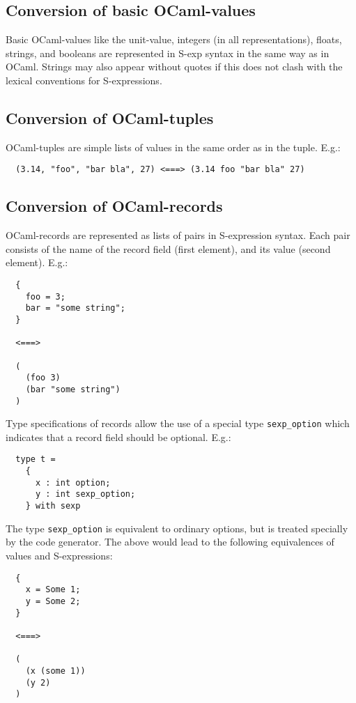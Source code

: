 \documentclass[a4paper]{article}
\begin{document}
\subsection{Conversion of basic OCaml-values}

Basic OCaml-values like the unit-value, integers (in all representations),
floats, strings, and booleans are represented in S-exp syntax in the
same way as in OCaml.  Strings may also appear without quotes if this
does not clash with the lexical conventions for S-expressions.

\subsection{Conversion of OCaml-tuples}

OCaml-tuples are simple lists of values in the same order as in the tuple.
E.g.:

\begin{verbatim}
  (3.14, "foo", "bar bla", 27) <===> (3.14 foo "bar bla" 27)
\end{verbatim}

\subsection{Conversion of OCaml-records}

OCaml-records are represented as lists of pairs in S-expression syntax.
Each pair consists of the name of the record field (first element),
and its value (second element).  E.g.:

\begin{verbatim}
  {
    foo = 3;
    bar = "some string";
  }

  <===>

  (
    (foo 3)
    (bar "some string")
  )
\end{verbatim}

Type specifications of records allow the use of a special type
\verb=sexp_option= which indicates that a record field should be optional.
E.g.:

\begin{verbatim}
  type t =
    {
      x : int option;
      y : int sexp_option;
    } with sexp
\end{verbatim}

The type \verb=sexp_option= is equivalent to ordinary options, but is
treated specially by the code generator.  The above would lead to the
following equivalences of values and S-expressions:

\begin{verbatim}
  {
    x = Some 1;
    y = Some 2;
  }

  <===>

  (
    (x (some 1))
    (y 2)
  )
\end{verbatim}
\end{document}
